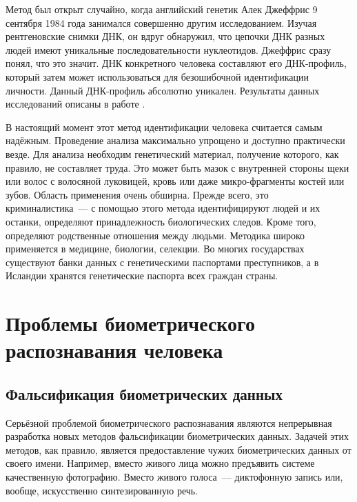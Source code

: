 \documentclass[14pt, a4paper]{extarticle}
\begin{document}

Метод был открыт случайно, когда английский генетик Алек Джеффрис 9 сентября 1984 года занимался совершенно другим исследованием. Изучая рентгеновские снимки ДНК, он вдруг обнаружил, что цепочки ДНК разных людей имеют уникальные последовательности нуклеотидов. Джеффрис сразу понял, что это значит. ДНК конкретного человека составляют его ДНК-профиль, который затем может использоваться для безошибочной идентификации личности. Данный ДНК-профиль абсолютно уникален. Результаты данных исследований описаны в работе \cite{gill1985forensic}.

В настоящий момент этот метод идентификации человека считается самым надёжным. Проведение анализа максимально упрощено и доступно практически везде. Для анализа необходим генетический материал, получение которого, как правило, не составляет труда. Это может быть мазок с внутренней стороны щеки или волос с волосяной луковицей, кровь или даже микро-фрагменты костей или зубов. Область применения очень обширна. Прежде всего, это криминалистика~--- с помощью этого метода идентифицируют людей и их останки, определяют принадлежность биологических следов. Кроме того, определяют родственные отношения между людьми. Методика широко применяется в медицине, биологии, селекции. Во многих государствах существуют банки данных с генетическими паспортами преступников, а в Исландии хранятся генетические паспорта всех граждан страны.

\newpage
\section{Проблемы биометрического распознавания человека}

\subsection{Фальсификация биометрических данных}
Серьёзной проблемой биометрического распознавания являются непрерывная разработка новых методов фальсификации биометрических данных. Задачей этих методов, как правило, является предоставление чужих биометрических данных от своего имени. Например, вместо живого лица можно предъявить системе качественную фотографию. Вместо живого голоса~--- диктофонную запись или, вообще, искусственно синтезированную речь.
\end{document}
